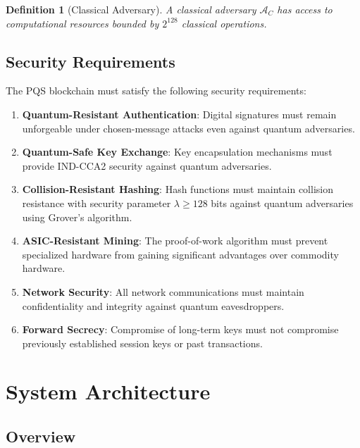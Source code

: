 \documentclass[12pt,a4paper]{article}
\newtheorem{definition}{Definition}
\begin{document}
\begin{definition}[Classical Adversary]
A classical adversary $\mathcal{A}_C$ has access to computational resources bounded by $2^{128}$ classical operations.
\end{definition}

\subsection{Security Requirements}

The PQS blockchain must satisfy the following security requirements:

\begin{enumerate}
\item \textbf{Quantum-Resistant Authentication}: Digital signatures must remain unforgeable under chosen-message attacks even against quantum adversaries.

\item \textbf{Quantum-Safe Key Exchange}: Key encapsulation mechanisms must provide IND-CCA2 security against quantum adversaries.

\item \textbf{Collision-Resistant Hashing}: Hash functions must maintain collision resistance with security parameter $\lambda \geq 128$ bits against quantum adversaries using Grover's algorithm.

\item \textbf{ASIC-Resistant Mining}: The proof-of-work algorithm must prevent specialized hardware from gaining significant advantages over commodity hardware.

\item \textbf{Network Security}: All network communications must maintain confidentiality and integrity against quantum eavesdroppers.

\item \textbf{Forward Secrecy}: Compromise of long-term keys must not compromise previously established session keys or past transactions.
\end{enumerate}

\section{System Architecture}

\subsection{Overview}
\end{document}
